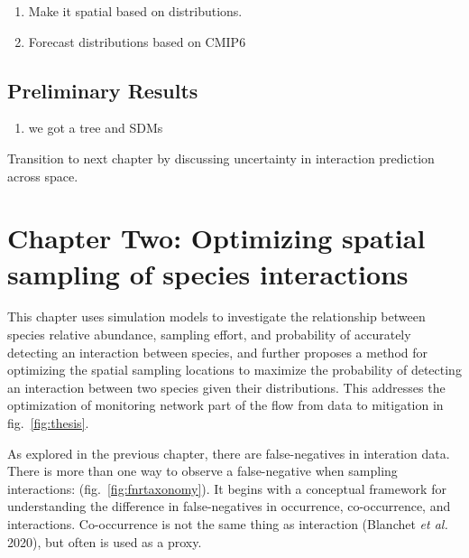 \documentclass[10pt,oneside]{article}
\begin{document}
\begin{enumerate}
\def\labelenumi{\arabic{enumi})}
\setcounter{enumi}{1}
\item
  Make it spatial based on distributions.
\item
  Forecast distributions based on CMIP6
\end{enumerate}

\hypertarget{preliminary-results}{%
\subsection{Preliminary Results}\label{preliminary-results}}

\begin{enumerate}
\def\labelenumi{\arabic{enumi})}
\tightlist
\item
  we got a tree and SDMs
\end{enumerate}

Transition to next chapter by discussing uncertainty in interaction
prediction across space.

\hypertarget{chapter-two-optimizing-spatial-sampling-of-species-interactions}{%
\section{Chapter Two: Optimizing spatial sampling of species
interactions}\label{chapter-two-optimizing-spatial-sampling-of-species-interactions}}

This chapter uses simulation models to investigate the relationship
between species relative abundance, sampling effort, and probability of
accurately detecting an interaction between species, and further
proposes a method for optimizing the spatial sampling locations to
maximize the probability of detecting an interaction between two species
given their distributions. This addresses the optimization of monitoring
network part of the flow from data to mitigation in
fig.~\ref{fig:thesis}.

As explored in the previous chapter, there are false-negatives in
interation data. There is more than one way to observe a false-negative
when sampling interactions: (fig.~\ref{fig:fnrtaxonomy}). It begins with
a conceptual framework for understanding the difference in
false-negatives in occurrence, co-occurrence, and interactions.
Co-occurrence is not the same thing as interaction (Blanchet \emph{et
al.} 2020), but often is used as a proxy.
\end{document}
